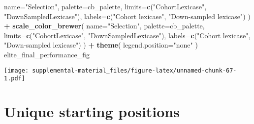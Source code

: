 \documentclass[]{book}
\newenvironment{Shaded}{\begin{snugshade}}{\end{snugshade}}
\newcommand{\DataTypeTok}[1]{\textcolor[rgb]{0.13,0.29,0.53}{#1}}
\newcommand{\KeywordTok}[1]{\textcolor[rgb]{0.13,0.29,0.53}{\textbf{#1}}}
\newcommand{\NormalTok}[1]{#1}
\newcommand{\OperatorTok}[1]{\textcolor[rgb]{0.81,0.36,0.00}{\textbf{#1}}}
\newcommand{\StringTok}[1]{\textcolor[rgb]{0.31,0.60,0.02}{#1}}
\begin{document}
\begin{Shaded}
\begin{Highlighting}[]
    \DataTypeTok{name=}\StringTok{"Selection"}\NormalTok{,}
    \DataTypeTok{palette=}\NormalTok{cb_palette,}
    \DataTypeTok{limits=}\KeywordTok{c}\NormalTok{(}\StringTok{"CohortLexicase"}\NormalTok{, }\StringTok{"DownSampledLexicase"}\NormalTok{),}
    \DataTypeTok{labels=}\KeywordTok{c}\NormalTok{(}\StringTok{"Cohort lexicase"}\NormalTok{, }\StringTok{"Down-sampled lexicase"}\NormalTok{)}
\NormalTok{  ) }\OperatorTok{+}
\StringTok{  }\KeywordTok{scale_color_brewer}\NormalTok{(}
    \DataTypeTok{name=}\StringTok{"Selection"}\NormalTok{,}
    \DataTypeTok{palette=}\NormalTok{cb_palette,}
    \DataTypeTok{limits=}\KeywordTok{c}\NormalTok{(}\StringTok{"CohortLexicase"}\NormalTok{, }\StringTok{"DownSampledLexicase"}\NormalTok{),}
    \DataTypeTok{labels=}\KeywordTok{c}\NormalTok{(}\StringTok{"Cohort lexicase"}\NormalTok{, }\StringTok{"Down-sampled lexicase"}\NormalTok{)}
\NormalTok{  ) }\OperatorTok{+}
\StringTok{  }\KeywordTok{theme}\NormalTok{(}
    \DataTypeTok{legend.position=}\StringTok{"none"}
\NormalTok{  )}
\NormalTok{elite_final_performance_fig}
\end{Highlighting}
\end{Shaded}

\texttt{[image: supplemental-material\_files/figure-latex/unnamed-chunk-67-1.pdf]}

\hypertarget{unique-starting-positions-6}{%
\section{Unique starting positions}\label{unique-starting-positions-6}}
\end{document}
